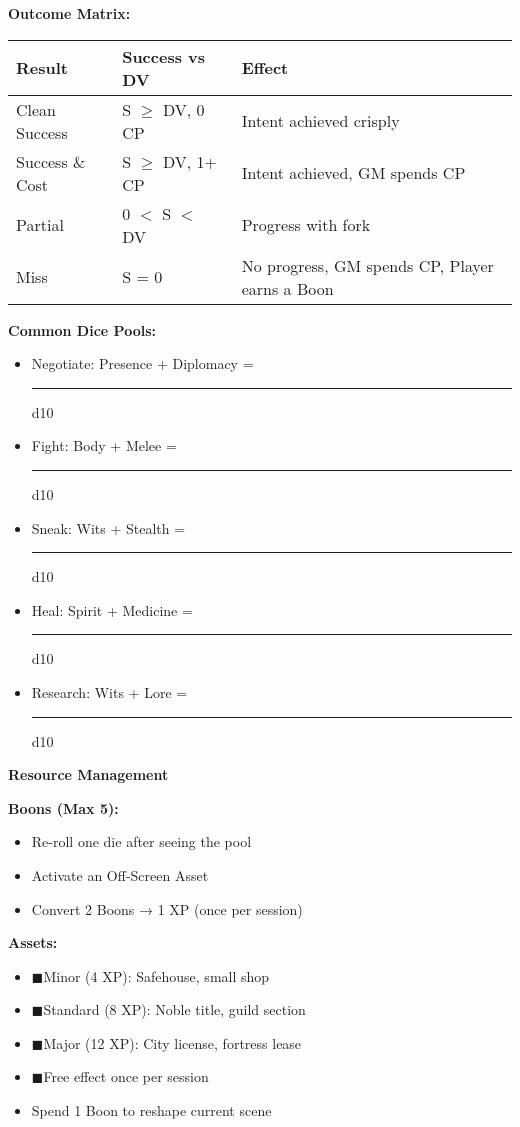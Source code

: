 \documentclass[10pt]{article}
\newcommand{\boon}{\textcolor{orange}{\ding{72}}}
\newcommand{\asset}{\textcolor{green!60!black}{$\blacksquare$}}
\begin{document}
\begin{mdframed}[backgroundcolor=background, linewidth=0pt]
\begin{adjustwidth}{0.2cm}{0.2cm}
\textbf{Outcome Matrix:}
\begin{center}
\begin{tabular}{|l|l|l|}
\hline
\cellcolor{lightaccent} \textbf{Result} & \cellcolor{lightaccent} \textbf{Success vs DV} & \cellcolor{lightaccent} \textbf{Effect} \\
\hline
Clean Success & S $\geq$ DV, 0 CP & Intent achieved crisply \\
Success \& Cost & S $\geq$ DV, 1+ CP & Intent achieved, GM spends CP \\
Partial & 0 $<$ S $<$ DV & Progress with fork \\
Miss & S = 0 & No progress, GM spends CP, Player earns a Boon \\
\hline
\end{tabular}
\end{center}

\textbf{Common Dice Pools:}
\begin{itemize}[leftmargin=*]
\item Negotiate: Presence + Diplomacy = \rule{2cm}{0.4pt} d10
\item Fight: Body + Melee = \rule{2cm}{0.4pt} d10
\item Sneak: Wits + Stealth = \rule{2cm}{0.4pt} d10
\item Heal: Spirit + Medicine = \rule{2cm}{0.4pt} d10
\item Research: Wits + Lore = \rule{2cm}{0.4pt} d10
\end{itemize}
\end{adjustwidth}

\vspace{0.3cm}

\begin{mdframed}[backgroundcolor=sectionbg, linewidth=1pt, linecolor=accentcolor]
\textbf{\large Resource Management}
\end{mdframed}

\begin{adjustwidth}{0.2cm}{0.2cm}
\vspace{0.2cm}
\textbf{Boons (Max 5):}
\begin{itemize}[leftmargin=*]
\item \boon Re-roll one die after seeing the pool
\item \boon Activate an Off-Screen Asset
\item \boon Convert 2 Boons → 1 XP (once per session)
\end{itemize}

\textbf{Assets:}
\begin{itemize}[leftmargin=*]
\item \asset Minor (4 XP): Safehouse, small shop
\item \asset Standard (8 XP): Noble title, guild section
\item \asset Major (12 XP): City license, fortress lease
\item \asset Free effect once per session
\item Spend 1 Boon to reshape current scene
\end{itemize}


\end{adjustwidth}
\end{mdframed}
\end{document}
